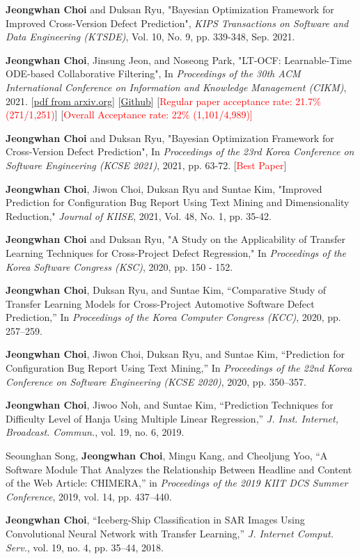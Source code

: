 \documentclass[10pt]{article}
\newenvironment{changemargin}[2]{
  \begin{list}{}{
    \setlength{\topsep}{0pt}
    \setlength{\leftmargin}{#1}
    \setlength{\rightmargin}{#2}
    \setlength{\listparindent}{\parindent}
    \setlength{\itemindent}{\parindent}
    \setlength{\parsep}{\parskip}
  }
  \item[]}{\end{list}
}
\newcommand{\presentation}[2]{
	{#1} \hfill \emph{#2}\\ \bigskip
}
\newcommand{\RED}[1]{\textcolor{red}{#1}}
\newenvironment{body} {
	\vspace*{-16pt}
	\begin{changemargin}{-0.25in}{-0.5in}
  }
	{\end{changemargin}
}
\begin{document}
\begin{body}
\presentation{\textbf{Jeongwhan Choi} and Duksan Ryu, "Bayesian Optimization Framework for Improved Cross-Version Defect Prediction", \emph{KIPS Transactions on Software and Data Engineering (KTSDE)}, Vol. 10, No. 9, pp. 339-348, Sep. 2021.}{}
\presentation{\textbf{Jeongwhan Choi}, Jinsung Jeon, and Noseong Park,  "LT-OCF: Learnable-Time ODE-based Collaborative Filtering", In \emph{Proceedings of the 30th ACM International Conference on Information and Knowledge Management (CIKM)}, 2021. [\href{https://arxiv.org/pdf/2108.06208.pdf}{pdf from arxiv.org}] [\href{https://github.com/jeongwhanchoi/LT-OCF}{Github}]  [\RED{Regular paper acceptance rate: 21.7\% (271/1,251)}]  [\RED{Overall Acceptance rate: 22\% (1,101/4,989)]} }{}
\presentation{\textbf{Jeongwhan Choi} and Duksan Ryu, "Bayesian Optimization Framework for Cross-Version Defect Prediction", In \emph{Proceedings of the 23rd Korea Conference on Software Engineering (KCSE 2021)}, 2021, pp. 63-72.  [\RED{Best Paper}]}{}
\presentation{\textbf{Jeongwhan Choi}, Jiwon Choi, Duksan Ryu and Suntae Kim, "Improved Prediction for Configuration Bug Report Using Text Mining and Dimensionality Reduction," \emph{Journal of KIISE}, 2021, Vol. 48, No. 1, pp. 35-42.}{}
\presentation{\textbf{Jeongwhan Choi} and Duksan Ryu, "A Study on the Applicability of Transfer Learning Techniques for Cross-Project Defect Regression," In \emph{Proceedings of the Korea Software Congress (KSC)}, 2020, pp. 150 - 152.}{}
\presentation{\textbf{Jeongwhan Choi}, Duksan Ryu, and Suntae Kim, “Comparative Study of Transfer Learning Models for Cross-Project Automotive Software Defect Prediction,” In \emph{Proceedings of the Korea Computer Congress (KCC)}, 2020, pp. 257–259.}{}
\presentation{\textbf{Jeongwhan Choi}, Jiwon Choi, Duksan Ryu, and Suntae Kim, “Prediction for Configuration Bug Report Using Text Mining,” In \emph{Proceedings of the 22nd Korea Conference on Software Engineering (KCSE 2020)}, 2020, pp. 350–357.}{}
\presentation{\textbf{Jeongwhan Choi}, Jiwoo Noh, and Suntae Kim, “Prediction Techniques for Difficulty Level of Hanja Using Multiple Linear Regression,” \emph{J. Inst. Internet, Broadcast. Commun.}, vol. 19, no. 6, 2019.}{}
\presentation{Seounghan Song, \textbf{Jeongwhan Choi}, Mingu Kang, and Cheoljung Yoo, “A Software Module That Analyzes the Relationship Between Headline and Content of the Web Article: CHIMERA,” in \emph{Proceedings of the 2019 KIIT DCS Summer Conference}, 2019, vol. 14, pp. 437–440.}{}
\presentation{\textbf{Jeongwhan Choi}, “Iceberg-Ship Classification in SAR Images Using Convolutional Neural Network with Transfer Learning,” \emph{J. Internet Comput. Serv.}, vol. 19, no. 4, pp. 35–44, 2018.}{}

\end{body}
\end{document}
